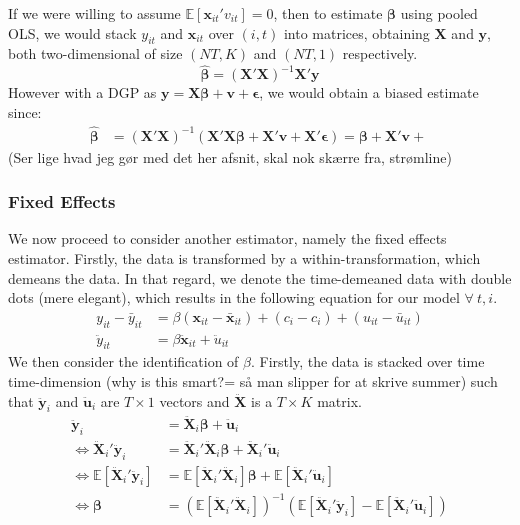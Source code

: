 If we were willing to assume $\mathbb{E}[\pmb{x}_{it}'v_{it}]=0$, then to estimate $\pmb{\beta}$ using pooled OLS, we would stack $y_{it}$ and $\pmb{x}_{it}$ over $(i,t)$ into matrices, obtaining $\pmb{X}$ and $\pmb{y}$, both two-dimensional of size $(NT,K)$ and $(NT,1)$ respectively.
$$\hat{\pmb{\beta}} = (\pmb{X}' \pmb{X})^{-1}\pmb{X}'\pmb{y}$$
However with a DGP as $\pmb{y}=\pmb{X}\pmb{\beta}+\pmb{v}+\pmb{\epsilon}$, we would obtain a biased estimate since:
\begin{align*}
    \hat{\pmb{\beta}} &= (\pmb{X}'\pmb{X})^{-1} (\pmb{X}'\pmb{X}\pmb{\beta} +\pmb{X}'\pmb{v}+\pmb{X}'\pmb{\epsilon})=\pmb{\beta}+\pmb{X}'\pmb{v} +\
\end{align*}
(Ser lige hvad jeg gør med det her afsnit, skal nok skærre fra, strømline)

\subsubsection*{Fixed Effects}
We now proceed to consider another estimator, namely the fixed effects estimator. Firstly, the data is transformed by a within-transformation, which demeans the data. In that regard, we denote the time-demeaned data with double dots (mere elegant), which results in the following equation for our model $\forall \ t,i$.
\begin{align*}
    y_{it}-\bar{y}_{it} &= \beta(\pmb{x}_{it}-\bar{\pmb{x}}_{it})+(c_i-c_i)+(u_{it} - \bar{u}_{it}) \\
    \ddot{y}_{it} &= \beta \ddot{\pmb{x}}_{it}+\ddot{u}_{it}
\end{align*}
We then consider the identification of $\beta$. Firstly, the data is stacked over time time-dimension (why is this smart?= så man slipper for at skrive summer) such that $\ddot{\pmb{y}}_{i}$ and $\ddot{\pmb{u}}_{i}$ are $T \times 1$ vectors and $\pmb{\ddot{X}}$ is a $T\times K$ matrix.
\begin{align*}
    \ddot{\pmb{y}}_{i} &= \pmb{\ddot{X}}_{i} \pmb{\beta}  +\pmb{\ddot{u}}_{i} \\
    \Leftrightarrow \pmb{\ddot{X}}_{i}'\ddot{\pmb{y}}_{i}&=\pmb{\ddot{X}}_{i}'\pmb{\ddot{X}}_{i}\pmb{\beta} +\pmb{\ddot{X}}_{i}'\pmb{\ddot{u}}_{i} \\
    \Leftrightarrow \mathbb{E}[\pmb{\ddot{X}}_{i}'\pmb{\ddot{y}}_{i}] &=\mathbb{E}[\pmb{\ddot{X}}_{i}'\pmb{\ddot{X}}_{i}] \pmb{\beta}  + \mathbb{E}[\pmb{\ddot{X}}_{i}'\pmb{\ddot{u}}_{i}] \\ \Leftrightarrow  \pmb{\beta} &= (\mathbb{E}[\pmb{\ddot{X}}_{i}'\pmb{\ddot{X}}_{i}])^{-1} \left(  \mathbb{E}[\pmb{\ddot{X}}_{i}'\pmb{\ddot{y}}_{i}]-\mathbb{E}[\pmb{\ddot{X}}_{i}' \pmb{\ddot{u}}_{i}]\right)
\end{align*}

